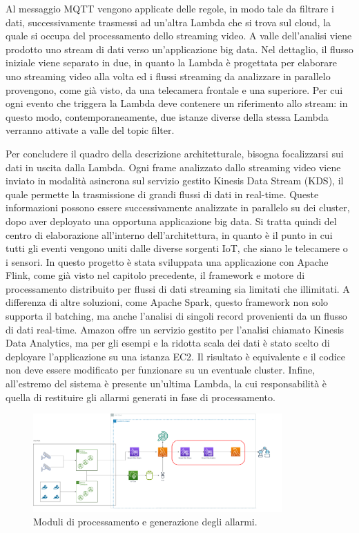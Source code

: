 Al messaggio MQTT vengono applicate delle regole, in modo tale da filtrare i dati, successivamente trasmessi ad un’altra Lambda che si trova sul cloud, la quale si occupa del processamento dello streaming video. A valle dell’analisi viene prodotto uno stream di dati verso un’applicazione big data. Nel dettaglio, il flusso iniziale viene separato in due, in quanto la Lambda è progettata per elaborare uno streaming video alla volta ed i flussi streaming da analizzare in parallelo provengono, come già visto, da una telecamera frontale e una superiore. Per cui ogni evento che triggera la Lambda deve contenere un riferimento allo stream: in questo modo, contemporaneamente, due istanze diverse della stessa Lambda verranno attivate a valle del topic filter. 

Per concludere il quadro della descrizione architetturale, bisogna focalizzarsi sui dati in uscita dalla Lambda. Ogni frame analizzato dallo streaming video viene inviato in modalità asincrona sul servizio gestito Kinesis Data Stream (KDS), il quale permette la trasmissione di grandi flussi di dati in real-time. Queste informazioni possono essere successivamente analizzate in parallelo su dei cluster, dopo aver deployato una opportuna applicazione big data. Si tratta quindi del centro di elaborazione all'interno dell'architettura, in quanto è il punto in cui tutti gli eventi vengono uniti dalle diverse sorgenti IoT, che siano le telecamere o i sensori. In questo progetto è stata sviluppata una applicazione con Apache Flink, come già visto nel capitolo precedente, il framework e motore di processamento distribuito per flussi di dati streaming sia limitati che illimitati. 
A differenza di altre soluzioni, come Apache Spark, questo framework non solo supporta il batching, ma anche l’analisi di singoli record provenienti da un flusso di dati real-time. Amazon offre un servizio gestito per l’analisi chiamato Kinesis Data Analytics, ma per gli esempi e la ridotta scala dei dati è stato scelto di deployare l’applicazione su una istanza EC2. Il risultato è equivalente e il codice non deve essere modificato per funzionare su un eventuale cluster. Infine, all'estremo del sistema è presente un'ultima Lambda, la cui responsabilità è quella di restituire gli allarmi generati in fase di processamento. 

\begin{figure}[htbp]
    \centering
    \includegraphics[width=0.85\textwidth]{figures/processing-subsystem.png}
    \caption{Moduli di processamento e generazione degli allarmi.} 
    \label{fig:processing-subsystem}
\end{figure}

